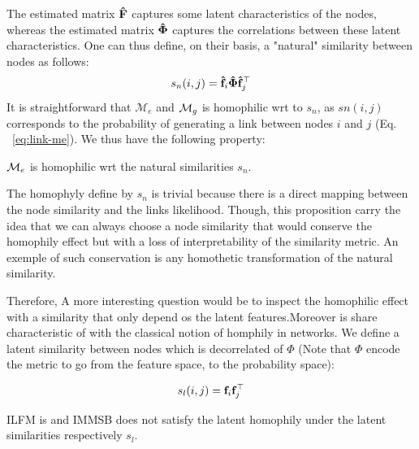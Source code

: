 The estimated matrix $\mathbf{\hat{F}}$ captures some latent characteristics of the nodes, whereas the estimated matrix $\mathbf{\hat{\Phi}}$ captures the correlations between these latent characteristics. One can thus define, on their basis, a "natural" similarity between nodes as follows:
%
\begin{equation}
s_n(i,j) = \mathbf{\hat{f}}_{i} \mathbf{\hat{\Phi}} \mathbf{\hat{f}}_j^\top \nonumber
\end{equation}
%
It is straightforward that $\mathcal{M}_e$ and $\mathcal{M}_g$ is homophilic wrt to $s_n$, as $sn(i,j)$ corresponds to the probability of generating a link between nodes $i$ and $j$ (Eq.   ~\ref{eq:link-me}). We thus have the following property:
%
\begin{proposition}[] $\mathcal{M}_e$ is homophilic wrt the natural similarities $s_n$.
\end{proposition}

The homophyly define by $s_n$ is trivial because there is a direct mapping between the node similarity and the links likelihood. Though, this proposition carry the idea that we can always choose a node similarity that would conserve the homophily effect but with a loss of interpretability of the similarity metric. An exemple of such conservation is any homothetic transformation of the natural similarity.

Therefore, A more interesting question would be to inspect the homophilic effect with a similarity that only depend os the latent features.Moreover is share characteristic of with the classical notion of homphily in networks. We define a latent similarity between nodes which is decorrelated of $\Phi$ (Note that $\Phi$ encode the metric to go from the feature space, to the probability space):

\begin{align}
&s_l(i,j) = \mat{f}_{i} \mat{f}_j^\top \nonumber \\
\label{eq:latent-sim}
\end{align}


\begin{proposition}[]
	ILFM is and IMMSB does not satisfy the latent homophily under the latent similarities respectively $s_l$.
\end{proposition}

